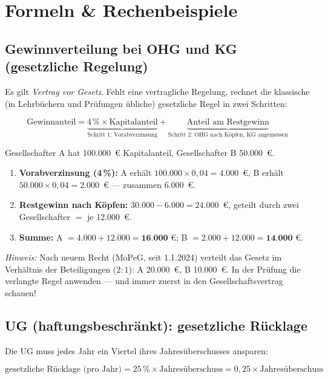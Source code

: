 \documentclass[11pt, a4paper]{article}
\begin{document}
\section{Formeln \& Rechenbeispiele}

\subsection{Gewinnverteilung bei OHG und KG (gesetzliche Regelung)}

Es gilt \emph{Vertrag vor Gesetz}. Fehlt eine vertragliche Regelung, rechnet die
klassische (in Lehrbüchern und Prüfungen übliche) gesetzliche Regel in zwei Schritten:

\[
\textrm{Gewinnanteil} = \underbrace{4\,\% \times \textrm{Kapitalanteil}}_{\textrm{Schritt 1: Vorabverzinsung}}
+ \underbrace{\textrm{Anteil am Restgewinn}}_{\textrm{Schritt 2: OHG nach Köpfen, KG angemessen}}
\]

\begin{beispiel}[title={\bfseries Zahlenbeispiel: OHG mit 30.000~€ Gewinn}]
Gesellschafter A hat 100.000~€ Kapitalanteil, Gesellschafter B 50.000~€.
\begin{enumerate}
  \item \textbf{Vorabverzinsung (4\,\%):} A erhält $100.000 \times 0{,}04 = 4.000$~€,
    B erhält $50.000 \times 0{,}04 = 2.000$~€ --- zusammen 6.000~€.
  \item \textbf{Restgewinn nach Köpfen:} $30.000 - 6.000 = 24.000$~€, geteilt durch
    zwei Gesellschafter $=$ je 12.000~€.
  \item \textbf{Summe:} A $= 4.000 + 12.000 = \textbf{16.000~€}$;
    B $= 2.000 + 12.000 = \textbf{14.000~€}$.
\end{enumerate}
\emph{Hinweis:} Nach neuem Recht (MoPeG, seit 1.1.2024) verteilt das Gesetz im
Verhältnis der Beteiligungen ($2:1$): A 20.000~€, B 10.000~€. In der Prüfung die
verlangte Regel anwenden --- und immer zuerst in den Gesellschaftsvertrag schauen!
\end{beispiel}

\subsection{UG (haftungsbeschränkt): gesetzliche Rücklage}

Die UG muss jedes Jahr ein Viertel ihres Jahresüberschusses ansparen:

\[
\textrm{gesetzliche Rücklage (pro Jahr)} = 25\,\% \times \textrm{Jahresüberschuss}
= 0{,}25 \times \textrm{Jahresüberschuss}
\]
\end{document}
